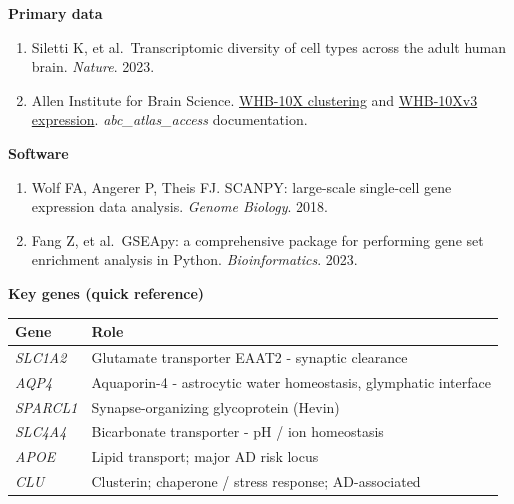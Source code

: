 \documentclass[
  11pt,
]{article}
\newcounter{none} %
\providecommand{\tightlist}{%
  \setlength{\itemsep}{0pt}\setlength{\parskip}{0pt}}
\begin{document}
\textbf{Primary data}

\begin{enumerate}
\def\labelenumi{\arabic{enumi}.}
\tightlist
\item
  Siletti K, et al.~Transcriptomic diversity of cell types across the
  adult human brain. \emph{Nature}. 2023.
\item
  Allen Institute for Brain Science.
  \href{https://alleninstitute.github.io/abc_atlas_access/descriptions/WHB-10X-clustering.html}{WHB-10X
  clustering} and
  \href{https://alleninstitute.github.io/abc_atlas_access/descriptions/WHB-10Xv3.html}{WHB-10Xv3
  expression}. \emph{abc\_atlas\_access} documentation.
\end{enumerate}

\textbf{Software}

\begin{enumerate}
\def\labelenumi{\arabic{enumi}.}
\setcounter{enumi}{2}
\tightlist
\item
  Wolf FA, Angerer P, Theis FJ. SCANPY: large-scale single-cell gene
  expression data analysis. \emph{Genome Biology}. 2018.
\item
  Fang Z, et al.~GSEApy: a comprehensive package for performing gene set
  enrichment analysis in Python. \emph{Bioinformatics}. 2023.
\end{enumerate}

\textbf{Key genes (quick reference)}

{\def\LTcaptype{none} %
\begin{longtable}[]{@{}
  >{\raggedright\arraybackslash}p{}
  >{\raggedright\arraybackslash}p{}@{}}
\toprule\noalign{}
\begin{minipage}[b]{\linewidth}\raggedright
Gene
\end{minipage} & \begin{minipage}[b]{\linewidth}\raggedright
Role
\end{minipage} \\
\midrule\noalign{}
\endhead
\bottomrule\noalign{}
\endlastfoot
\emph{SLC1A2} & Glutamate transporter EAAT2 - synaptic clearance \\
\emph{AQP4} & Aquaporin-4 - astrocytic water homeostasis, glymphatic
interface \\
\emph{SPARCL1} & Synapse-organizing glycoprotein (Hevin) \\
\emph{SLC4A4} & Bicarbonate transporter - pH / ion homeostasis \\
\emph{APOE} & Lipid transport; major AD risk locus \\
\emph{CLU} & Clusterin; chaperone / stress response; AD-associated \\
\end{longtable}
}
\end{document}
